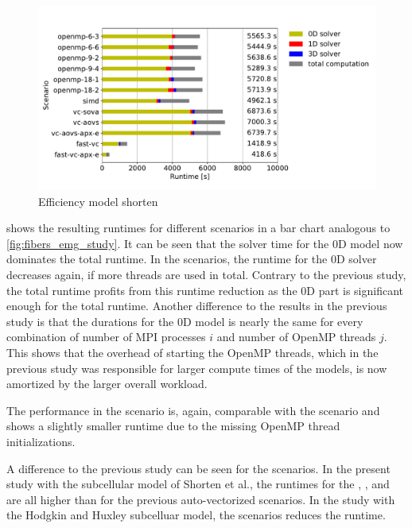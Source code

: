 \begin{figure}
  \centering%
  \includegraphics[width=\textwidth]{images/results/studies/fibers_emg_study_shorten.pdf}%
  \caption{Efficiency model shorten}%
  \label{fig:fibers_emg_study_shorten}%
\end{figure}%

 shows the resulting runtimes for different scenarios in a bar chart analogous to \cref{fig:fibers_emg_study}. It can be seen that the solver time for the 0D model now dominates the total runtime. In the  scenarios, the runtime for the 0D solver decreases again, if more threads are used in total. Contrary to the previous study, the total runtime profits from this runtime reduction as the 0D part is significant enough for the total runtime. Another difference to the results in the previous study is that the durations for the 0D model is nearly the same for every combination of number of MPI processes $i$ and number of OpenMP threads $j$. This shows that the overhead of starting the OpenMP threads, which in the previous study was responsible for larger compute times of the models, is now amortized by the larger overall workload.

The performance in the  scenario is, again, comparable with the  scenario and shows a slightly smaller runtime due to the missing OpenMP thread initializations.

A difference to the previous study can be seen for the  scenarios. In the present study with the subcellular model of Shorten et al., the runtimes for the , , and  are all higher than for the previous auto-vectorized scenarios. In the study with the Hodgkin and Huxley subcelluar model, the  scenarios reduces the runtime. 

